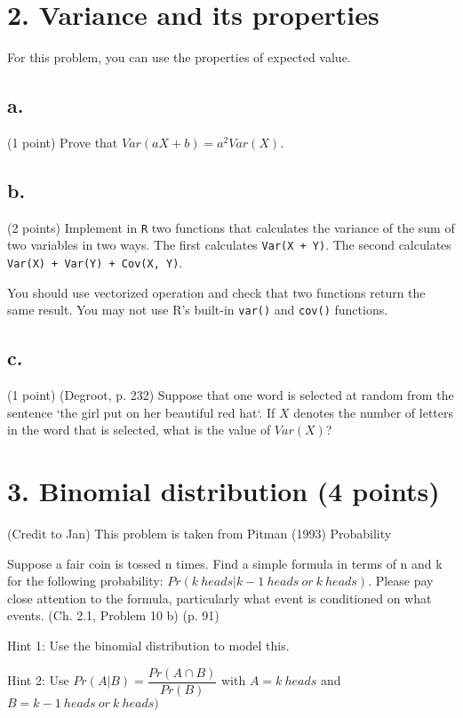 \documentclass{article}\usepackage[]{graphicx}\usepackage[]{color}
\begin{document}
\section*{2. Variance and its properties}

For this problem, you can use the properties of expected value.

\subsection*{a.} (1 point) Prove that $Var(aX + b) = a^2 Var(X)$.

\subsection*{b.} (2 points) Implement in \verb`R` two functions that calculates the variance of the sum of two variables in two ways. The first calculates \verb`Var(X + Y)`. The second calculates \verb`Var(X) + Var(Y) + Cov(X, Y)`.

You should use vectorized operation and check that two functions return the same result. You may not use R's built-in \verb`var()` and \verb`cov()` functions.

\subsection*{c.} (1 point) (Degroot, p. 232) Suppose that one word is selected at random from the sentence `the girl put on her beautiful red hat`. If $X$ denotes the number of letters in the word that is selected, what is the value of $Var(X)$?


\section*{3. Binomial distribution (4 points)}

(Credit to Jan) This problem is taken from Pitman (1993) Probability

Suppose a fair coin is tossed n times. Find a simple formula in terms of n and k for the following probability: $Pr(k\ heads | k-1\ heads\ or\ k\ heads)$. Please pay close attention to the formula, particularly what event is conditioned on what events. (Ch. 2.1, Problem 10 b) (p. 91)

Hint 1: Use the binomial distribution to model this.

Hint 2: Use $Pr(A | B) = \dfrac{Pr (A \cap B)}{Pr (B)}$ with $A = k\ heads$ and $B = k-1\ heads\ or\ k\ heads)$
\end{document}
